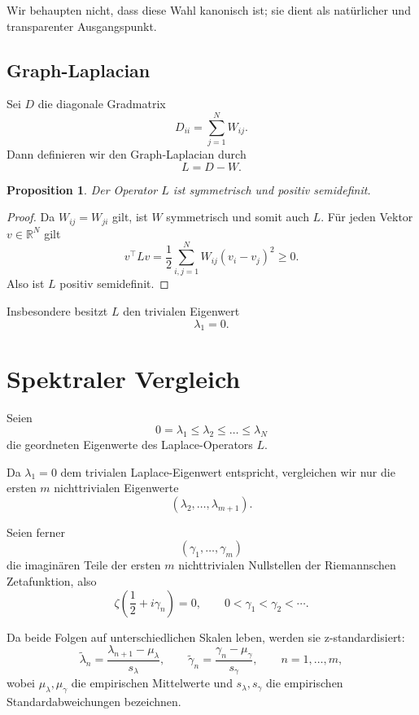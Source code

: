 \documentclass[11pt,a4paper,draft]{article}
\newtheorem{proposition}[definition]{Proposition}
\newcommand{\R}{\mathbb{R}}
\begin{document}
	Wir behaupten nicht, dass diese Wahl kanonisch ist; sie dient als natürlicher und transparenter Ausgangspunkt.
	
	\subsection{Graph-Laplacian}
	
	Sei \(D\) die diagonale Gradmatrix
	\[
	D_{ii}=\sum_{j=1}^N W_{ij}.
	\]
	Dann definieren wir den Graph-Laplacian durch
	\[
	L=D-W.
	\]
	
	\begin{proposition}
		Der Operator \(L\) ist symmetrisch und positiv semidefinit.
	\end{proposition}
	
	\begin{proof}
		Da \(W_{ij}=W_{ji}\) gilt, ist \(W\) symmetrisch und somit auch \(L\). Für jeden Vektor \(v\in\R^N\) gilt
		\[
		v^\top L v
		=
		\frac12 \sum_{i,j=1}^N W_{ij}(v_i-v_j)^2 \ge 0.
		\]
		Also ist \(L\) positiv semidefinit.
	\end{proof}
	
	Insbesondere besitzt \(L\) den trivialen Eigenwert
	\[
	\lambda_1=0.
	\]
	
	\section{Spektraler Vergleich}
	
	Seien
	\[
	0=\lambda_1\le \lambda_2\le \dots \le \lambda_N
	\]
	die geordneten Eigenwerte des Laplace-Operators \(L\).
	
	Da \(\lambda_1=0\) dem trivialen Laplace-Eigenwert entspricht, vergleichen wir nur die ersten \(m\) nichttrivialen Eigenwerte
	\[
	(\lambda_2,\dots,\lambda_{m+1}).
	\]
	
	Seien ferner
	\[
	(\gamma_1,\dots,\gamma_m)
	\]
	die imaginären Teile der ersten \(m\) nichttrivialen Nullstellen der Riemannschen Zetafunktion, also
	\[
	\zeta\!\left(\frac12+i\gamma_n\right)=0,
	\qquad
	0<\gamma_1<\gamma_2<\cdots.
	\]
	
	Da beide Folgen auf unterschiedlichen Skalen leben, werden sie z-standardisiert:
	\[
	\widetilde{\lambda}_n
	=
	\frac{\lambda_{n+1}-\mu_\lambda}{s_\lambda},
	\qquad
	\widetilde{\gamma}_n
	=
	\frac{\gamma_n-\mu_\gamma}{s_\gamma},
	\qquad n=1,\dots,m,
	\]
	wobei \(\mu_\lambda,\mu_\gamma\) die empirischen Mittelwerte und \(s_\lambda,s_\gamma\) die empirischen Standardabweichungen bezeichnen.
	
\end{document}
